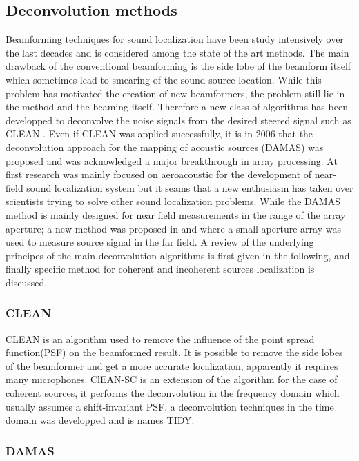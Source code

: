 \subsection{Deconvolution methods}

Beamforming techniques for sound localization have been study intensively over the last decades and is considered among the state of the art methods. The main drawback of the conventional beamforming is the side lobe of the beamform itself which sometimes lead to smearing of the sound source location. While this problem has motivated the creation of new beamformers, the problem still lie in the method and the beaming itself. Therefore a new class of algorithms has been developped to deconvolve the noise signals from the desired steered signal such as CLEAN \cite{sijtsma2007clean}. Even if CLEAN was applied successfully, it is in 2006 that the deconvolution approach for the mapping of acoustic sources (DAMAS) was proposed \cite{brooks2006deconvolution} and was acknowledged a major breakthrough in array processing. At first research was mainly focused on aeroacoustic for the development of near-field sound localization system but it seams that a new enthusiasm has taken over scientists trying to solve other sound localization problems. While the DAMAS method is mainly designed for near field measurements in the range of the array aperture; a new method was proposed in \cite{zhao2015large} and \cite{zhao2017large} where a small aperture array was used to measure source signal in the far field. A review of the underlying principes of the main deconvolution algorithms is first given in the following, and finally specific method for coherent and incoherent sources localization is discussed.

\subsubsection{CLEAN}

CLEAN is an algorithm used to remove the influence of the point spread function(PSF) on the beamformed result. It is possible to remove the side lobes of the beamformer and get a more accurate localization, apparently it requires many microphones. ClEAN-SC is an extension of the algorithm for the case of coherent sources, it performs the deconvolution in the frequency domain which usually assumes a shift-invariant PSF, a deconvolution techniques in the time domain was developped and is names TIDY.

\subsubsection{DAMAS}

